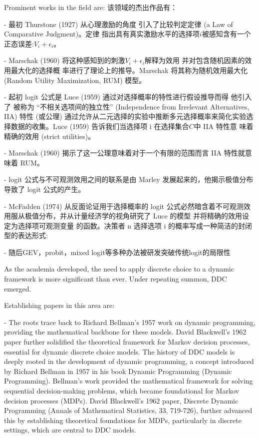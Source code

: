 \documentclass[a4paper,12pt,oneside]{book} %
\begin{document}
Prominent works in the field are:
该领域的杰出作品有：


- 最初 Thurstone (1927) 从心理激励的角度 引入了比较判定定律 (a Law of Comparative Judgment)。定律 指出具有真实激励水平的选择项$i$被感知含有一个正态误差:$V_i+\epsilon_i$。

- Marschak (1960) 将这种感知到的刺激$V_i+\epsilon_i$解释为效用 并对包含随机因素的效用最大化的选择概 率进行了理论上的推导。Marschak 将其称为随机效用最大化 (Random Utility Maximization, RUM) 模型。

- 起初 logit 公式是 Luce (1959) 通过对选择概率的特性进行假设推导而得 他引入了 被称为 “不相关选项间的独立性” (Independence from Irrelevant Alternatives, IIA) 特性 (或公理) 通过允许从二元选择的实验中推断多元选择概率来简化实验选择数据的收集。Luce (1959) 告诉我们当选择项 i 在选择集合$C$中 IIA 特性意 味着精确的效用 (strict utilities)。

- Marschak (1960) 揭示了这一公理意味着对于一个有限的范围而言 IIA 特性就意味着 RUM。

- logit 公式与不可观测效用之间的联系是由 Marley 发展起来的，他揭示极值分布导致了 logit 公式的产生。

- McFadden (1974) 从反面论证用于选择概率的 logit 公式必然暗含着不可观测效用服从极值分布，并从计量经济学的视角研究了 Luce 的模型 并将精确的效用设定为选择项可观测变量 的函数。决策者 n 选择选项 i 的概率写成一种简洁的封闭型的表达形式:

- 随后GEV，probit，mixed logit等多种办法被研发突破传统logit的局限性





As the academia developed, the need to apply discrete choice to a dynamic framework is more significant than ever. Under repeating summon, DDC emerged.

Establishing papers in this area are:

- The roots trace back to Richard Bellman's 1957 work on dynamic programming, providing the mathematical backbone for these models. David Blackwell's 1962 paper further solidified the theoretical framework for Markov decision processes, essential for dynamic discrete choice models.
The history of DDC models is deeply rooted in the development of dynamic programming, a concept introduced by Richard Bellman in 1957 in his book Dynamic Programming (Dynamic Programming). Bellman's work provided the mathematical framework for solving sequential decision-making problems, which became foundational for Markov decision processes (MDPs). David Blackwell's 1962 paper, Discrete Dynamic Programming (Annals of Mathematical Statistics, 33, 719-726), further advanced this by establishing theoretical foundations for MDPs, particularly in discrete settings, which are central to DDC models.
\end{document}
